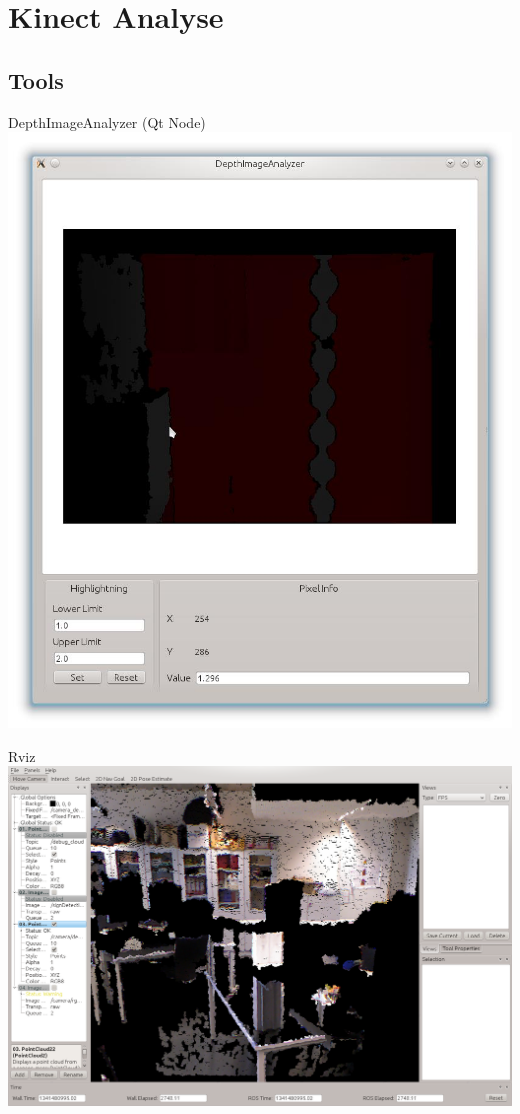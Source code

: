 \documentclass{VLKlauck}
\begin{document}
	
	\section{Kinect Analyse} 
	\subsection{Tools}
	
	\begin{frame}{DepthImageAnalyzer (Qt Node)}
		\includegraphics[scale=0.2]{DepthImageAnalyzer.jpg}
	\end{frame}
	
	\begin{frame}{Rviz}
		\includegraphics[scale=0.4]{RVizPointCloud.png}
	\end{frame} 
	
\end{document}
